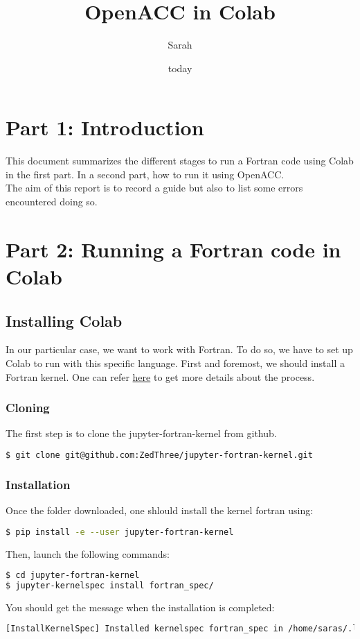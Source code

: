 \documentclass[10pt,a4paper]{article}
\author{Sarah}
\title{OpenACC in Colab}
\date{today}
\begin{document}
\maketitle{}
\newpage

\section{Part 1: Introduction}
This document summarizes the different stages to run a Fortran code using Colab in the first part. In a second part, how to run it using OpenACC.\\
The aim of this report is to record a guide but also to list some errors encountered doing so.
\section{Part 2: Running a Fortran code in Colab}
\subsection{Installing Colab}
In our particular case, we want to work with Fortran. To do so, we have to set up Colab to run with this specific language.
First and foremost, we should install a Fortran kernel. One can refer \href{https://github.com/ZedThree/jupyter-fortran-kernel}{here} to get more details about the process.\\

\subsubsection{Cloning}
\noindent The first step is to clone the jupyter-fortran-kernel from github.
\begin{lstlisting}[language=bash]
$ git clone git@github.com:ZedThree/jupyter-fortran-kernel.git
\end{lstlisting}

\subsubsection{Installation}
Once the folder downloaded, one shlould install the kernel fortran using:
\begin{lstlisting}[language=bash]
$ pip install -e --user jupyter-fortran-kernel
\end{lstlisting}

\noindent Then, launch the following commands:
\begin{lstlisting}[language=bash]
$ cd jupyter-fortran-kernel
$ jupyter-kernelspec install fortran_spec/
\end{lstlisting}
You should get the message when the installation is completed:
\begin{lstlisting}[language=bash]
[InstallKernelSpec] Installed kernelspec fortran_spec in /home/saras/.local/share/jupyter/kernels/fortran_spec
\end{lstlisting}
\end{document}
